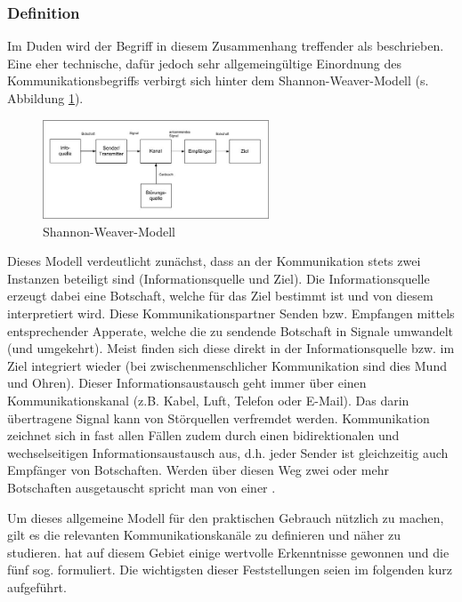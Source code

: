 \subsubsection{Definition}
Im Duden wird der Begriff in diesem Zusammenhang treffender  als  beschrieben.
Eine eher technische, dafür jedoch sehr allgemeingültige Einordnung des Kommunikationsbegriffs verbirgt sich hinter dem Shannon-Weaver-Modell (s. Abbildung \ref{fig:shannon-weaver-modell}).

\begin{figure}[htbp]
	\centering
	\includegraphics[width=0.6\textwidth]{abb/shannon-weaver-modell.jpg}
	\caption{Shannon-Weaver-Modell}
	\label{fig:shannon-weaver-modell}
\end{figure}


Dieses Modell verdeutlicht zunächst, dass an der Kommunikation stets zwei Instanzen beteiligt sind (Informationsquelle und Ziel).
Die Informationsquelle erzeugt dabei eine Botschaft, welche für das Ziel bestimmt ist und von diesem interpretiert wird.
Diese Kommunikationspartner Senden bzw. Empfangen mittels entsprechender Apperate, welche die zu sendende Botschaft in Signale umwandelt (und umgekehrt).
Meist finden sich diese  direkt in der Informationsquelle bzw. im Ziel integriert wieder (bei zwischenmenschlicher Kommunikation sind dies Mund und Ohren).
Dieser Informationsaustausch geht immer über einen Kommunikationskanal (z.B. Kabel, Luft, Telefon oder E-Mail). Das darin übertragene Signal kann von Störquellen verfremdet werden.
Kommunikation zeichnet sich in fast allen Fällen zudem durch einen bidirektionalen und wechselseitigen Informationsaustausch aus, d.h. jeder Sender ist gleichzeitig auch Empfänger von Botschaften.
Werden über diesen Weg zwei oder mehr Botschaften ausgetauscht spricht man von einer .
\cite{duden}
\cite{human-hacking}
\cite{grundlagen-der-kommunikation}

Um dieses allgemeine Modell für den praktischen Gebrauch nützlich zu machen, gilt es die relevanten Kommunikationskanäle zu definieren und näher zu studieren.
 hat auf diesem Gebiet einige wertvolle Erkenntnisse gewonnen und die fünf sog.  formuliert.
Die wichtigsten dieser Feststellungen seien im folgenden kurz aufgeführt.
\cite{grundlagen-der-kommunikation}

